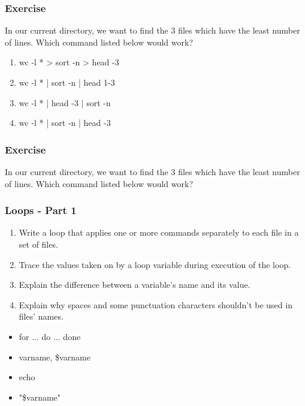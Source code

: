 \documentclass[xcolor=dvipsnames]{beamer}
\begin{document}
\begin{frame}
\frametitle{Exercise}
In our current directory, we want to find the 3 files which have the least number of lines. Which command listed below would work?

\begin{enumerate}
\item wc -l * > sort -n > head -3
\item wc -l * | sort -n | head 1-3
\item wc -l * | head -3 | sort -n
\item wc -l * | sort -n | head -3
\end{enumerate}
\end{frame}

\begin{frame}
\frametitle{Exercise}
In our current directory, we want to find the 3 files which have the least number of lines. Which command listed below would work?

\end{frame}


\begin{frame}
\frametitle{Loops - Part 1}
\begin{enumerate}
  \item Write a loop that applies one or more commands separately to each file in a set of files.
  \item Trace the values taken on by a loop variable during execution of the loop.
  \item Explain the difference between a variable's name and its value.
  \item Explain why spaces and some punctuation characters shouldn't be used in files' names.
\end{enumerate}
\begin{multicols}{2}
\begin{itemize}
  \item for ... do ... done
  \item varname, \$varname
  \item echo
  \item "\$varname"
\end{itemize}
\end{multicols}
\end{frame}
\end{document}
